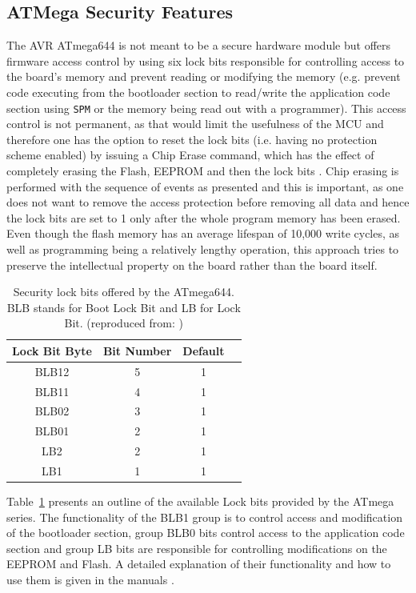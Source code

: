 \subsection{ATMega Security Features}
The AVR ATmega644 is not meant to be a secure hardware module but offers firmware access control by using six lock bits responsible for controlling access to the board's memory and prevent reading or modifying the memory (e.g. prevent code executing from the bootloader section to read/write the application code section using \texttt{SPM} or the memory being read out with a programmer). This access control is not permanent, as that would limit the usefulness of the MCU and therefore one has the option to reset the lock bits (i.e. having no protection scheme enabled) by issuing a Chip Erase command, which has the effect of completely erasing the Flash, EEPROM and then the lock bits \citep{atmega_manual}. Chip erasing is performed with the sequence of events as presented and this is important, as one does not want to remove the access protection before removing all data and hence the lock bits are set to 1 only after the whole program memory has been erased. Even though the flash memory has an average lifespan of 10,000 write cycles, as well as programming being a relatively lengthy operation, this approach tries to preserve the intellectual property on the board rather than the board itself.
\begin{table}
\caption{\footnotesize Security lock bits offered by the ATmega644. BLB stands for Boot Lock Bit and LB for Lock Bit. (reproduced from: \protect\citep{tech:avrfreaks} \citep{atmega_manual})}
\label{table:lock_bits}
\center
\begin{tabular}{| c | c | c | c |}
\hline
\textbf{Lock Bit Byte} & \textbf{Bit Number} & \textbf{Default}\\
\hline \hline
BLB12 & 5 & 1\\
BLB11 & 4 & 1\\
BLB02 & 3 & 1\\
BLB01 & 2 & 1\\
LB2 & 2 & 1 \\
LB1 & 1 & 1 \\
\hline
\end{tabular}
\end{table}
Table~\ref{table:lock_bits} presents an outline of the available Lock bits provided by the ATmega series. The functionality of the BLB1 group is to control access and modification of the bootloader section, group BLB0 bits control access to the application code section and group LB bits are responsible for controlling modifications on the EEPROM and Flash. A detailed explanation of their functionality and how to use them is given in the manuals \citep{atmega_manual} \citep{tech:avrfreaks}.

